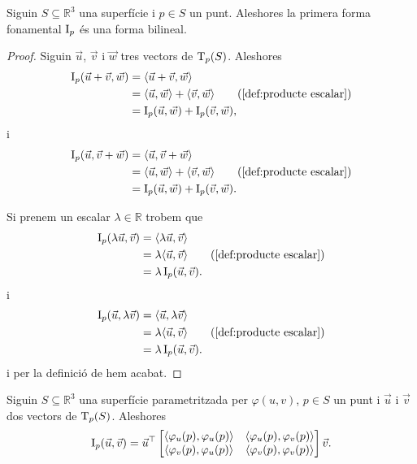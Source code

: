 \documentclass[../Apunts.tex]{subfiles}
\begin{document}
	\begin{proposition}
		\label{prop:la primera forma fonamental és una forma bilineal}
		Siguin \(S\subseteq\mathbb{R}^{3}\) una superfície i \(p\in S\) un punt. Aleshores la primera forma fonamental \(\I_{p}\) és una forma bilineal.
	\end{proposition}
	\begin{proof}
		Siguin \(\vec{u}\), \(\vec{v}\) i \(\vec{w}\) tres vectors de \(\operatorname{T}_{p}(S)\). Aleshores
		\begin{align*}
			\I_{p}(\vec{u}+\vec{v},\vec{w})&=\prodesc{\vec{u}+\vec{v}}{\vec{w}} \\
			&=\prodesc{\vec{u}}{\vec{w}}+\prodesc{\vec{v}}{\vec{w}} \tag{\ref{def:producte escalar}}\\
			&=\I_{p}(\vec{u},\vec{w})+\I_{p}(\vec{v},\vec{w}),
		\end{align*}
		i
		\begin{align*}
			\I_{p}(\vec{u},\vec{v}+\vec{w})&=\prodesc{\vec{u}}{\vec{v}+\vec{w}} \\
			&=\prodesc{\vec{u}}{\vec{w}}+\prodesc{\vec{v}}{\vec{w}} \tag{\ref{def:producte escalar}}\\
			&=\I_{p}(\vec{u},\vec{w})+\I_{p}(\vec{v},\vec{w}).
		\end{align*}
		
		Si prenem un escalar \(\lambda\in\mathbb{R}\) trobem que
		\begin{align*}
			\I_{p}(\lambda\vec{u},\vec{v})&=\prodesc{\lambda\vec{u}}{\vec{v}} \\
			&=\lambda\prodesc{\vec{u}}{\vec{v}} \tag{\ref{def:producte escalar}}\\
			&=\lambda\I_{p}(\vec{u},\vec{v}).
		\end{align*}
		i
		\begin{align*}
			\I_{p}(\vec{u},\lambda\vec{v})&=\prodesc{\vec{u}}{\lambda\vec{v}} \\
			&=\lambda\prodesc{\vec{u}}{\vec{v}} \tag{\ref{def:producte escalar}}\\
			&=\lambda\I_{p}(\vec{u},\vec{v}).
		\end{align*}
		i per la definició de  hem acabat.
	\end{proof}
	\begin{proposition}
		\label{prop:coeficients de la primera forma fonamental}
		Siguin \(S\subseteq\mathbb{R}^{3}\) una superfície parametritzada per \(\varphi(u,v)\), \(p\in S\) un punt i \(\vec{u}\) i \(\vec{v}\) dos vectors de \(\operatorname{T}_{p}(S)\). Aleshores
		\[\I_{p}(\vec{u},\vec{v})=\vec{u}^{\transposta}\begin{bmatrix}
			\prodesc{\varphi_{u}(p)}{\varphi_{u}(p)} & \prodesc{\varphi_{u}(p)}{\varphi_{v}(p)} \\
			\prodesc{\varphi_{v}(p)}{\varphi_{u}(p)} & \prodesc{\varphi_{v}(p)}{\varphi_{v}(p)}
		\end{bmatrix}\vec{v}.\]
	\end{proposition}
\end{document}
